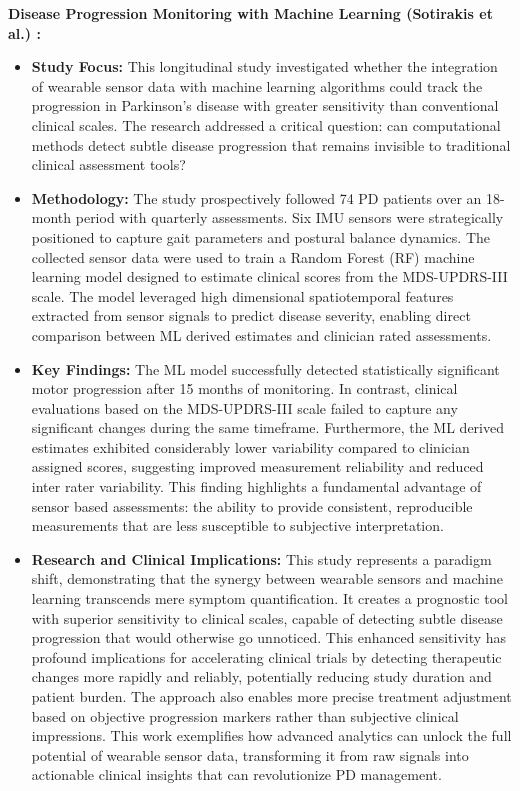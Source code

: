\documentclass[sigconf,nonacm]{acmart}
\begin{document}
    \textbf{Disease Progression Monitoring with Machine Learning (Sotirakis et al.) \cite{Sotirakis2023MotorProgressionPD}:}
    \begin{itemize}
        \item \textbf{Study Focus:} This longitudinal study investigated whether the integration of wearable sensor data with machine learning algorithms could track the progression in Parkinson's disease with greater sensitivity than conventional clinical scales. The research addressed a critical question: can computational methods detect subtle disease progression that remains invisible to traditional clinical assessment tools?
        
        \item \textbf{Methodology:} The study prospectively followed 74 PD patients over an 18-month period with quarterly assessments. Six IMU sensors were strategically positioned to capture gait parameters and postural balance dynamics. The collected sensor data were used to train a Random Forest (RF) machine learning model designed to estimate clinical scores from the MDS-UPDRS-III scale. The model leveraged high dimensional spatiotemporal features extracted from sensor signals to predict disease severity, enabling direct comparison between ML derived estimates and clinician rated assessments.
        
        \item \textbf{Key Findings:} The ML model successfully detected statistically significant motor progression after 15 months of monitoring. In contrast, clinical evaluations based on the MDS-UPDRS-III scale failed to capture any significant changes during the same timeframe. Furthermore, the ML derived estimates exhibited considerably lower variability compared to clinician assigned scores, suggesting improved measurement reliability and reduced inter rater variability. This finding highlights a fundamental advantage of sensor based assessments: the ability to provide consistent, reproducible measurements that are less susceptible to subjective interpretation.
        
        \item \textbf{Research and Clinical Implications:} This study represents a paradigm shift, demonstrating that the synergy between wearable sensors and machine learning transcends mere symptom quantification. It creates a prognostic tool with superior sensitivity to clinical scales, capable of detecting subtle disease progression that would otherwise go unnoticed. This enhanced sensitivity has profound implications for accelerating clinical trials by detecting therapeutic changes more rapidly and reliably, potentially reducing study duration and patient burden. The approach also enables more precise treatment adjustment based on objective progression markers rather than subjective clinical impressions. This work exemplifies how advanced analytics can unlock the full potential of wearable sensor data, transforming it from raw signals into actionable clinical insights that can revolutionize PD management.
    \end{itemize}
\end{document}
